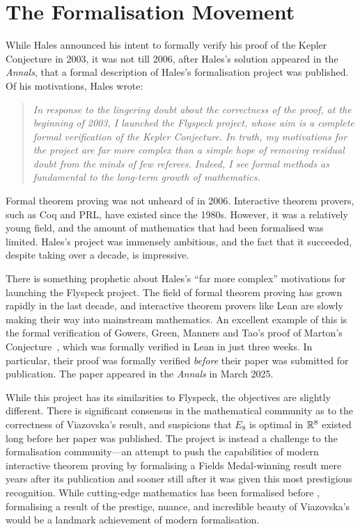 \section{The Formalisation Movement}

While Hales announced his intent to formally verify his proof of the Kepler Conjecture in 2003, it was not till 2006, after Hales's solution appeared in the \textit{Annals}, that a formal description of Hales's formalisation project was published. Of his motivations, Hales wrote:
\begin{quote}
    \textit{In response to the lingering doubt about the correctness of the proof, at the beginning of 2003, I launched the \emph{Flyspeck} project, whose aim is a complete formal verification of the Kepler Conjecture. In truth, my motivations for the project are far more complex than a simple hope of removing residual doubt from the minds of few referees. Indeed, I see formal methods as fundamental to the long-term growth of mathematics.}~\cite{FlyspeckAnnouncement}
\end{quote}
Formal theorem proving was not unheard of in 2006. Interactive theorem provers, such as Coq and PRL, have existed since the 1980s. However, it was a relatively young field, and the amount of mathematics that had been formalised was limited. Hales's project was immensely ambitious, and the fact that it succeeded, despite taking over a decade, is impressive.

There is something prophetic about Hales's ``far more complex'' motivations for launching the Flyspeck project. The field of formal theorem proving has grown rapidly in the last decade, and interactive theorem provers like Lean are slowly making their way into mainstream mathematics. An excellent example of this is the formal verification of Gowers, Green, Manners and Tao's proof of Marton's Conjecture~\cite{PFRPublished}, which was formally verified in Lean in just three weeks. In particular, their proof was formally verified \textit{before} their paper was submitted for publication. The paper appeared in the \textit{Annals} in March 2025.

While this project has its similarities to Flyspeck, the objectives are slightly different. There is significant consensus in the mathematical community as to the correctness of Viazovska's result, and suspicions that $E_8$ is optimal in $\mathbb{R}^8$ existed long before her paper was published. The project is instead a challenge to the formalisation community---an attempt to push the capabilities of modern interactive theorem proving by formalising a Fields Medal-winning result mere years after its publication and sooner still after it was given this most prestigious recognition. While cutting-edge mathematics has been formalised before \cite{liquidtensor}, formalising a result of the prestige, nuance, and incredible beauty of Viazovska's would be a landmark achievement of modern formalisation.